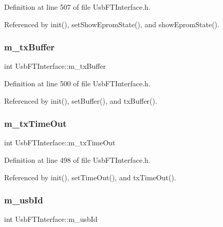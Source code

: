Definition at line 507 of file Usb\+F\+T\+Interface.\+h.



Referenced by init(), set\+Show\+Eprom\+State(), and show\+Eprom\+State().

\mbox{\label{classUsbFTInterface_a10385649160531f6976d55176bee1f2d}} 
\subsubsection{\texorpdfstring{m\+\_\+tx\+Buffer}{m\_txBuffer}}
{\footnotesize\ttfamily int Usb\+F\+T\+Interface\+::m\+\_\+tx\+Buffer\hspace{0.3cm}{\ttfamily [private]}}



Definition at line 500 of file Usb\+F\+T\+Interface.\+h.



Referenced by init(), set\+Buffer(), and tx\+Buffer().

\mbox{\label{classUsbFTInterface_af88e498a8ed759e35ae9e94f74ffcf56}} 
\subsubsection{\texorpdfstring{m\+\_\+tx\+Time\+Out}{m\_txTimeOut}}
{\footnotesize\ttfamily int Usb\+F\+T\+Interface\+::m\+\_\+tx\+Time\+Out\hspace{0.3cm}{\ttfamily [private]}}



Definition at line 498 of file Usb\+F\+T\+Interface.\+h.



Referenced by init(), set\+Time\+Out(), and tx\+Time\+Out().

\mbox{\label{classUsbFTInterface_a91df5c0547e8be460bc087e27afe05aa}} 
\subsubsection{\texorpdfstring{m\+\_\+usb\+Id}{m\_usbId}}
{\footnotesize\ttfamily int Usb\+F\+T\+Interface\+::m\+\_\+usb\+Id\hspace{0.3cm}{\ttfamily [private]}}



